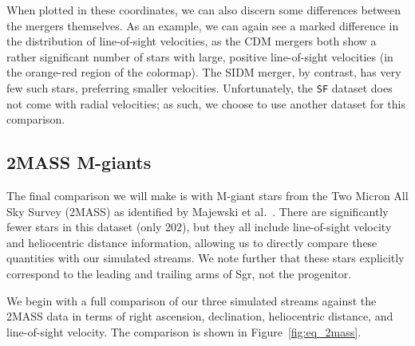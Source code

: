 When plotted in these coordinates, we can also discern some differences between
the mergers themselves. As an example, we can again see a marked difference in
the distribution of line-of-sight velocities, as the CDM mergers both show a
rather significant number of stars with large, positive line-of-sight
velocities (in the orange-red region of the colormap). The SIDM merger, by
contrast, has very few such stars, preferring smaller velocities. Unfortunately,
the \verb|SF| dataset does not come with radial velocities; as such, we choose
to use another dataset for this comparison.


\hypertarget{twomass}{\subsection{2MASS M-giants}\label{twomass}}

The final comparison we will make is with M-giant stars from the Two Micron All
Sky Survey (2MASS) as identified by Majewski et al.~\cite{majewski_two_2003}.
There are significantly fewer stars in this dataset (only 202), but they all
include line-of-sight velocity and heliocentric distance information, allowing
us to directly compare these quantities with our simulated streams. We note
further that these stars explicitly correspond to the leading and trailing arms
of Sgr, not the progenitor.

We begin with a full comparison of our three simulated streams against the 2MASS
data in terms of right ascension, declination, heliocentric distance, and
line-of-sight velocity. The comparison is shown in Figure~\ref{fig:eq_2mass}. 

